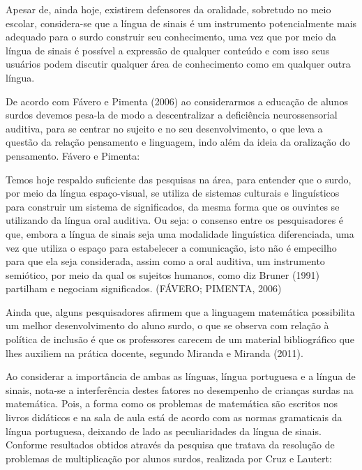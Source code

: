 \documentclass[brasil]{abnt}
\begin{document}
	Apesar de, ainda hoje, existirem defensores da oralidade, sobretudo no meio escolar, considera-se que a língua de sinais é um instrumento potencialmente mais adequado para o surdo construir seu 
	conhecimento, uma vez que por meio da língua de sinais é possível a expressão de qualquer conteúdo e com isso seus usuários podem discutir qualquer área de conhecimento como em qualquer outra 
	língua.  	 
	
	De acordo com Fávero e Pimenta (2006) ao considerarmos a educação de alunos surdos devemos pesa-la de modo a descentralizar a deficiência neurossensorial auditiva, para se centrar no sujeito
	e no seu desenvolvimento, o que leva a questão da relação pensamento e linguagem, indo além da ideia da oralização do pensamento. Fávero e Pimenta:
	
			\begin{citacao}Temos hoje respaldo suficiente das pesquisas na área, para entender que o surdo, por meio da língua espaço-visual, se utiliza de sistemas culturais e linguísticos para construir 
							um sistema de significados, da mesma forma que os ouvintes se utilizando da língua oral auditiva. Ou seja: o consenso entre os pesquisadores é que, embora a língua de sinais seja 
							uma modalidade linguística diferenciada, uma vez que utiliza o espaço para estabelecer a comunicação, isto não é empecilho para que ela seja considerada, assim como a oral auditiva, 
							um instrumento semiótico, por meio da qual os sujeitos humanos, como diz Bruner (1991) partilham e negociam significados. (FÁVERO; PIMENTA, 2006) 
			\end{citacao}
	
	Ainda que, alguns pesquisadores afirmem que a linguagem matemática possibilita um melhor desenvolvimento do aluno surdo, o que se observa com relação à política de inclusão é que os professores carecem 
	de um material bibliográfico que lhes auxiliem na prática docente, segundo Miranda e Miranda (2011).
	
	Ao considerar a importância de ambas as línguas, língua portuguesa e a língua de sinais, nota-se a interferência destes fatores no desempenho de crianças surdas na matemática. Pois, a forma como os problemas 
	de matemática são escritos nos livros didáticos e na sala de aula está de acordo com as normas gramaticais da língua portuguesa, deixando de lado as peculiaridades da língua de sinais. Conforme resultados obtidos
	através da pesquisa que tratava da resolução de problemas de multiplicação por alunos surdos, realizada por Cruz e Lautert:
	
\end{document}
